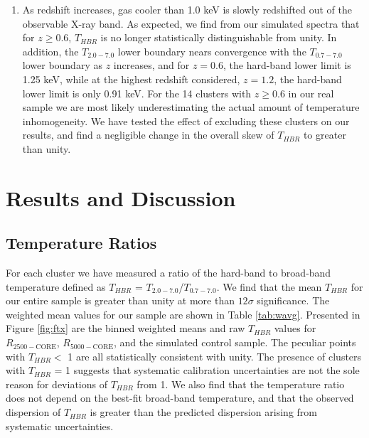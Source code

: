 \documentclass[12pt,preprint]{aastex}
\begin{document}
\begin{enumerate}
\item As redshift increases, gas cooler than 1.0 keV is slowly
redshifted out of the observable X-ray band. As expected, we find from
our simulated spectra that for $z \geq 0.6$, $T_{HBR}$ is no longer
statistically distinguishable from unity. In addition, the
$T_{2.0-7.0}$ lower boundary nears convergence with the $T_{0.7-7.0}$
lower boundary as $z$ increases, and for $z = 0.6$, the hard-band
lower limit is 1.25 keV, while at the highest redshift considered, $z =
1.2$, the hard-band lower limit is only 0.91 keV. For the 14
clusters with $z \geq 0.6$ in our real sample we are most likely
underestimating the actual amount of temperature inhomogeneity. We
have tested the effect of excluding these clusters on our results, and
find a negligible change in the overall skew of $T_{HBR}$ to greater
than unity.
\end{enumerate}

\section{Results and Discussion} \label{sec:r&d}

\subsection{Temperature Ratios} \label{sec:tfresults}

For each cluster we have measured a ratio of the hard-band
to broad-band temperature defined as $T_{HBR}$ =
$T_{2.0-7.0}$/$T_{0.7-7.0}$. We find that the mean $T_{HBR}$ for our
entire sample is greater than unity at more than $12\sigma$
significance. The weighted mean values for our sample are shown in
Table \ref{tab:wavg}. Presented in Figure  \ref{fig:ftx} are the binned
weighted means and raw $T_{HBR}$ values for $R_{2500-\mathrm{CORE}}$,
$R_{5000-\mathrm{CORE}}$, and the simulated control sample. The peculiar
points with $T_{HBR} <$ 1 are all statistically consistent with
unity. The presence of clusters with $T_{HBR}$ = 1 suggests that
systematic calibration uncertainties are not the sole reason for
deviations of $T_{HBR}$ from 1. We also find that the temperature
ratio does not depend on the best-fit broad-band temperature, and that
the observed dispersion of $T_{HBR}$ is greater than the predicted
dispersion arising from systematic uncertainties.
\end{document}
